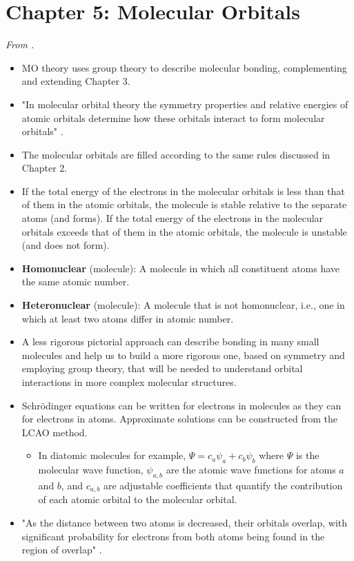 \documentclass[../notes.tex]{subfiles}
\begin{document}
\section{Chapter 5: Molecular Orbitals}
\emph{From \textcite{bib:MiesslerFischerTarr}.}
\begin{itemize}
    \item {}MO theory uses group theory to describe molecular bonding, complementing and extending Chapter 3.
    \item "In molecular orbital theory the symmetry properties and relative energies of atomic orbitals determine how these orbitals interact to form molecular orbitals" \parencite[117]{bib:MiesslerFischerTarr}.
    \item The molecular orbitals are filled according to the same rules discussed in Chapter 2.
    \item If the total energy of the electrons in the molecular orbitals is less than that of them in the atomic orbitals, the molecule is stable relative to the separate atoms (and forms). If the total energy of the electrons in the molecular orbitals exceeds that of them in the atomic orbitals, the molecule is unstable (and does not form).
    \item \textbf{Homonuclear} (molecule): A molecule in which all constituent atoms have the same atomic number.
    \item \textbf{Heteronuclear} (molecule): A molecule that is not homonuclear, i.e., one in which at least two atoms differ in atomic number.
    \item A less rigorous pictorial approach can describe bonding in many small molecules and help us to build a more rigorous one, based on symmetry and employing group theory, that will be needed to understand orbital interactions in more complex molecular structures.
    \item Schr\"{o}dinger equations can be written for electrons in molecules as they can for electrons in atoms. Approximate solutions can be constructed from the LCAO method.
    \begin{itemize}
        \item In diatomic molecules for example, $\Psi=c_a\psi_a+c_b\psi_b$ where $\Psi$ is the molecular wave function, $\psi_{a,b}$ are the atomic wave functions for atoms $a$ and $b$, and $c_{a,b}$ are adjustable coefficients that quantify the contribution of each atomic orbital to the molecular orbital.
    \end{itemize}
    \item "As the distance between two atoms is decreased, their orbitals overlap, with significant probability for electrons from both atoms being found in the region of overlap" \parencite[117]{bib:MiesslerFischerTarr}.

\end{itemize}
\end{document}
